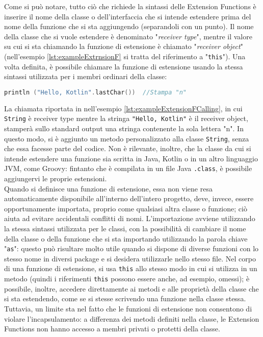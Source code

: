 Come si può notare, tutto ciò che richiede la sintassi delle Extension Functions è inserire il nome della classe o dell'interfaccia che si intende estendere prima del nome della funzione che si sta aggiungendo (separandoli con un punto). Il nome della classe che si vuole estendere è denominato "{\em receiver type}", mentre il valore su cui si sta chiamando la funzione di estensione è chiamato "{\em receiver object}" (nell'esempio \ref{lst:exampleExtrnsionF} si tratta del riferimento a "\texttt{this}"). Una volta definita, è possibile chiamare la funzione di estensione usando la stessa sintassi utilizzata per i membri ordinari della classe:\\

\begin{lstlisting}[caption={Chiamata di una Extension Function}, captionpos=b, label={lst:exampleExtensionFCalling}, language=Kotlin]
println ("Hello, Kotlin".lastChar())  //Stampa "n"
\end{lstlisting}

La chiamata riportata in nell'esempio \ref{lst:exampleExtensionFCalling}, in cui \texttt{String} è receiver type mentre la stringa \texttt{"Hello, Kotlin"} è il receiver object, stamperà sullo standard output una stringa contenente la sola lettera "n". In questo modo, si è aggiunto un metodo personalizzato alla classe \texttt{String}, senza che essa facesse parte del codice. Non è rilevante, inoltre, che la classe da cui si intende estendere una funzione sia scritta in Java, Kotlin o in un altro linguaggio JVM, come Groovy: fintanto che è compilata in un file Java \texttt{.class}, è possibile aggiungervi le proprie estensioni.\\
Quando si definisce una funzione di estensione, essa non viene resa automaticamente disponibile all'interno dell'intero progetto, deve, invece, essere opportunamente importata, proprio come qualsiasi altra classe o funzione; ciò aiuta ad evitare accidentali conflitti di nomi. L’importazione avviene utilizzando la stessa sintassi utilizzata per le classi, con la possibilità di cambiare il nome della classe o della funzione che si sta importando utilizzando la parola chiave "\texttt{as}": questo può risultare molto utile quando si dispone di diverse funzioni con lo stesso nome in diversi package e si desidera utilizzarle nello stesso file.
Nel corpo di una funzione di estensione, si usa \texttt{this} allo stesso modo in cui si utilizza in un metodo (quindi i riferimenti \texttt{this} possono essere anche, ad esempio, omessi); è possibile, inoltre, accedere direttamente ai metodi e alle proprietà della classe che si sta estendendo, come se si stesse scrivendo una funzione nella classe stessa. Tuttavia, un limite sta nel fatto che le funzioni di estensione non consentono di violare l'incapsulamento: a differenza dei metodi definiti nella classe, le Extension Functions non hanno accesso a membri privati o protetti della classe.\\

